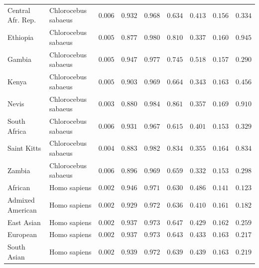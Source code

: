 \documentclass{article}
\begin{document}
\begin{center}
\begin{adjustbox}{width=\textwidth}
\begin{tabular}{||l|l|r||r|r||r|r||r|r||}
                \rowcolor{LIGHTGREY} Central Afr. Rep.       & Chlorocebus sabaeus & $ 0.006$ & $ 0.932$ & $ 0.968$ & $ 0.634$ & $ 0.413$ & $ 0.156$ & $ 0.334$ \\
                \rowcolor{LIGHTGREY} Ethiopia        & Chlorocebus sabaeus & $ 0.005$ & $ 0.877$ & $ 0.980$ & $ 0.810$ & $ 0.337$ & $ 0.160$ & $ 0.945$ \\
                \rowcolor{LIGHTGREY} Gambia             & Chlorocebus sabaeus & $ 0.005$ & $ 0.947$ & $ 0.977$ & $ 0.745$ & $ 0.518$ & $ 0.157$ & $ 0.290$ \\
                \rowcolor{LIGHTGREY} Kenya                                 & Chlorocebus sabaeus        & $ 0.005$ & $ 0.903$ & $ 0.969$ & $ 0.664$ & $ 0.343$ & $ 0.163$ & $ 0.456$ \\
                \rowcolor{LIGHTGREY} Nevis                        & Chlorocebus sabaeus        & $ 0.003$ & $ 0.880$ & $ 0.984$ & $ 0.861$ & $ 0.357$ & $ 0.169$ & $ 0.910$ \\
                \rowcolor{LIGHTGREY} South Africa                              & Chlorocebus sabaeus        & $ 0.006$ & $ 0.931$ & $ 0.967$ & $ 0.615$ & $ 0.401$ & $ 0.153$ & $ 0.329$ \\
                \rowcolor{LIGHTGREY} Saint Kitts                                & Chlorocebus sabaeus        & $ 0.004$ & $ 0.883$ & $ 0.982$ & $ 0.834$ & $ 0.355$ & $ 0.164$ & $ 0.834$ \\
                \rowcolor{LIGHTGREY} Zambia                             & Chlorocebus sabaeus        & $ 0.006$ & $ 0.896$ & $ 0.969$ & $ 0.659$ & $ 0.332$ & $ 0.153$ & $ 0.298$ \\
                African                             & Homo sapiens        & $ 0.002$ & $ 0.946$ & $ 0.971$ & $ 0.630$ & $ 0.486$ & $ 0.141$ & $ 0.123$ \\
                Admixed American                             & Homo sapiens        & $ 0.002$ & $ 0.929$ & $ 0.972$ & $ 0.636$ & $ 0.410$ & $ 0.161$ & $ 0.182$ \\
                East Asian                             & Homo sapiens        & $ 0.002$ & $ 0.937$ & $ 0.973$ & $ 0.647$ & $ 0.429$ & $ 0.162$ & $ 0.259$ \\
                European                             & Homo sapiens        & $ 0.002$ & $ 0.937$ & $ 0.973$ & $ 0.643$ & $ 0.433$ & $ 0.163$ & $ 0.217$ \\
                South Asian                             & Homo sapiens        & $ 0.002$ & $ 0.939$ & $ 0.972$ & $ 0.639$ & $ 0.439$ & $ 0.163$ & $ 0.219$ \\
                \bottomrule
            \end{tabular}
        \end{adjustbox}
    \end{center}
\end{document}
